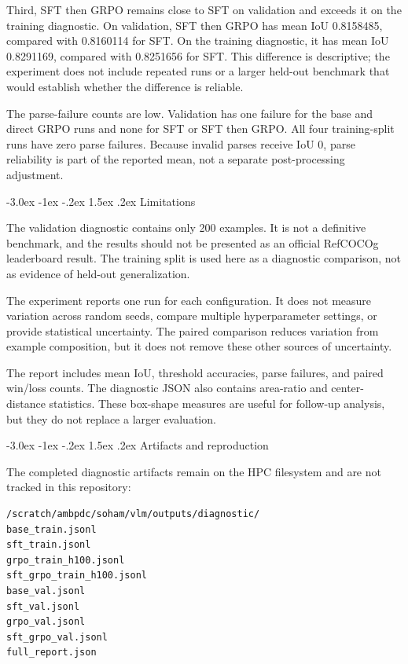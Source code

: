 \documentclass[11pt]{article}
\makeatletter
\renewcommand{\section}{\@startsection{section}{1}{\z@}%
  {-3.0ex \@plus -1ex \@minus -.2ex}%
  {1.5ex \@plus .2ex}%
  {\normalfont\normalsize\bfseries}}
\makeatother
\begin{document}
Third, SFT then GRPO remains close to SFT on validation and exceeds it on the
training diagnostic. On validation, SFT then GRPO has mean IoU 0.8158485,
compared with 0.8160114 for SFT. On the training diagnostic, it has mean IoU
0.8291169, compared with 0.8251656 for SFT. This difference is descriptive;
the experiment does not include repeated runs or a larger held-out benchmark
that would establish whether the difference is reliable.

The parse-failure counts are low. Validation has one failure for the base and
direct GRPO runs and none for SFT or SFT then GRPO. All four training-split
runs have zero parse failures. Because invalid parses receive IoU 0, parse
reliability is part of the reported mean, not a separate post-processing
adjustment.

\section{Limitations}

The validation diagnostic contains only 200 examples. It is not a definitive
benchmark, and the results should not be presented as an official RefCOCOg
leaderboard result. The training split is used here as a diagnostic comparison,
not as evidence of held-out generalization.

The experiment reports one run for each configuration. It does not measure
variation across random seeds, compare multiple hyperparameter settings, or
provide statistical uncertainty. The paired comparison reduces variation from
example composition, but it does not remove these other sources of uncertainty.

The report includes mean IoU, threshold accuracies, parse failures, and paired
win/loss counts. The diagnostic JSON also contains area-ratio and center-distance
statistics. These box-shape measures are useful for follow-up analysis, but
they do not replace a larger evaluation.

\section{Artifacts and reproduction}

The completed diagnostic artifacts remain on the HPC filesystem and are not
tracked in this repository:

\begin{verbatim}
/scratch/ambpdc/soham/vlm/outputs/diagnostic/
base_train.jsonl
sft_train.jsonl
grpo_train_h100.jsonl
sft_grpo_train_h100.jsonl
base_val.jsonl
sft_val.jsonl
grpo_val.jsonl
sft_grpo_val.jsonl
full_report.json
\end{verbatim}
\end{document}
